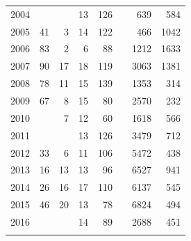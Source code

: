 \documentclass[12pt,]{article}
\begin{document}
\begin{longtable}{rrrrrrrr}
  2004 &  &  &   13 &  126 &  &  639 &  584 \\ 
  2005 &   41 &    3 &   14 &  122 &  &  466 & 1042 \\ 
  2006 &   83 &    2 &    6 &   88 &  & 1212 & 1633 \\ 
  2007 &   90 &   17 &   18 &  119 &  & 3063 & 1381 \\ 
  2008 &   78 &   11 &   15 &  139 &  & 1353 &  314 \\ 
  2009 &   67 &    8 &   15 &   80 &  & 2570 &  232 \\ 
  2010 &  &    7 &   12 &   60 &  & 1618 &  566 \\ 
  2011 &  &  &   13 &  126 &  & 3479 &  712 \\ 
  2012 &   33 &    6 &   11 &  106 &  & 5472 &  438 \\ 
  2013 &   16 &   13 &   13 &   96 &  & 6527 &  941 \\ 
  2014 &   26 &   16 &   17 &  110 &  & 6137 &  545 \\ 
  2015 &   46 &   20 &   13 &   78 &  & 6824 &  494 \\ 
  2016 &  &  &   14 &   89 &  & 2688 &  451 \\ 
   \hline
\hline
\label{tab:Southern_length}
\end{longtable}

\newpage
\end{document}
